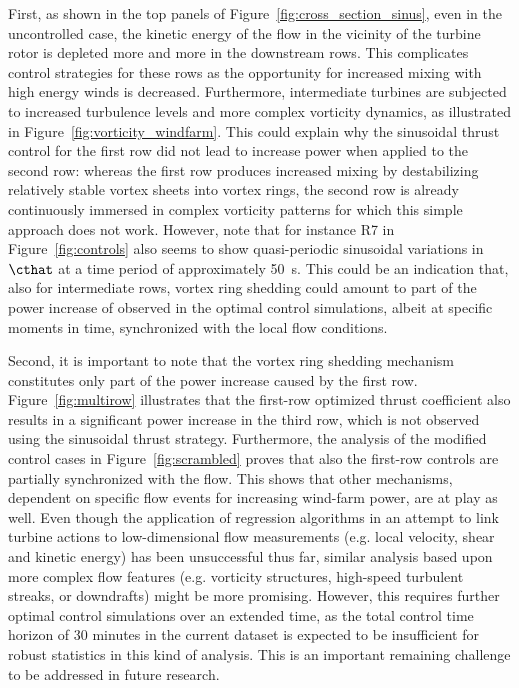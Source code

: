 First, as shown in the top panels of Figure~\ref{fig:cross_section_sinus}, even in the uncontrolled case, the kinetic energy of the flow in the vicinity of the turbine rotor is depleted more and more in the downstream rows. This complicates control strategies for these rows as the opportunity for increased mixing with high energy winds is decreased. Furthermore, intermediate turbines are subjected to increased turbulence levels and more complex vorticity dynamics, as illustrated in Figure~\ref{fig:vorticity_windfarm}. This could explain why the sinusoidal thrust control for the first row did not lead to increase power when applied to the second row: whereas the first row produces increased mixing by destabilizing relatively stable vortex sheets into vortex rings, the second row is already continuously immersed in complex vorticity patterns for which this simple approach does not work. 
However, note that for instance R7 in Figure~\ref{fig:controls} also seems to show quasi-periodic sinusoidal variations in $\cthat$ at a time period of approximately 50~s. This could be an indication that, also for intermediate rows, vortex ring shedding could amount to part of the power increase of observed in the optimal control simulations, albeit at specific moments in time, synchronized with the local flow conditions.

Second, it is important to note that the vortex ring shedding mechanism constitutes only part of the power increase caused by the first row. Figure~\ref{fig:multirow} illustrates that the first-row optimized thrust coefficient also results in a significant power increase in the third row, which is not observed using the sinusoidal thrust strategy. Furthermore, the analysis of the modified control cases in Figure~\ref{fig:scrambled} proves that also the first-row controls are partially synchronized with the flow. This shows that other mechanisms, dependent on specific flow events for increasing wind-farm power, are at play as well. Even though the application of regression algorithms in an attempt to link turbine actions to low-dimensional flow measurements (e.g. local velocity, shear and kinetic energy) has been unsuccessful thus far, similar analysis based upon more complex flow features (e.g. vorticity structures, high-speed turbulent streaks, or downdrafts) might be more promising. However, this requires further optimal control simulations over an extended time, as the total control time horizon of 30 minutes in the current dataset is expected to be insufficient for robust statistics in this kind of analysis. This is an important remaining challenge to be addressed in future research. 

